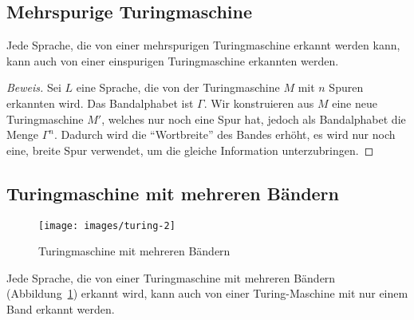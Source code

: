 \subsection{Mehrspurige Turingmaschine}
\begin{satz}\label{mehrspurigeturingmaschine}
Jede Sprache, die von einer mehrspurigen Turingmaschine
erkannt werden kann, kann auch von einer einspurigen Turingmaschine
erkannten werden.
\end{satz}

\begin{proof}[Beweis]
Sei $L$ eine Sprache, die von der Turingmaschine $M$ mit $n$ Spuren
erkannten wird. Das Bandalphabet ist $\Gamma$. Wir konstruieren aus
$M$ eine neue Turingmaschine $M'$, welches nur noch eine Spur hat,
jedoch als Bandalphabet die Menge $\Gamma^n$. Dadurch wird die ``Wortbreite''
des Bandes erhöht, es wird nur noch eine, breite Spur verwendet, um die
gleiche Information unterzubringen.
\end{proof}

\subsection{Turingmaschine mit mehreren Bändern}
\begin{figure}
\begin{center}
\texttt{[image: images/turing-2]}
\end{center}
\caption{Turingmaschine mit mehreren Bändern\label{multitapetm}}
\end{figure}
\begin{satz}
\label{mehrbandturingmaschine}
Jede Sprache, die von einer Turingmaschine mit mehreren Bändern
(Abbildung~\ref{multitapetm})
erkannt
wird, kann auch von einer Turing-Maschine mit nur einem Band erkannt
werden.
\end{satz}

